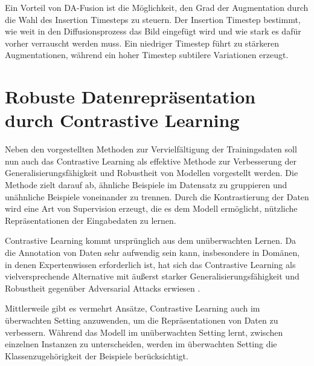 Ein Vorteil von DA-Fusion ist die Möglichkeit, den Grad der Augmentation durch die Wahl des Insertion Timesteps zu steuern. Der Insertion Timestep bestimmt, wie weit in den Diffusionsprozess das Bild eingefügt wird und wie stark es dafür vorher verrauscht werden muss. Ein niedriger Timestep führt zu stärkeren Augmentationen, während ein hoher Timestep subtilere Variationen erzeugt.



\section{Robuste Datenrepräsentation durch Contrastive Learning} \label{sec:contrastive-learning}

Neben den vorgestellten Methoden zur Vervielfältigung der Trainingsdaten soll nun auch das Contrastive Learning als effektive Methode zur Verbesserung der Generalisierungsfähigkeit und Robustheit von Modellen vorgestellt werden. Die Methode zielt darauf ab, ähnliche Beispiele im Datensatz zu gruppieren und unähnliche Beispiele voneinander zu trennen. Durch die Kontrastierung der Daten wird eine Art von Supervision erzeugt, die es dem Modell ermöglicht, nützliche Repräsentationen der Eingabedaten zu lernen.

Contrastive Learning kommt ursprünglich aus dem unüberwachten Lernen. Da die Annotation von Daten sehr aufwendig sein kann, insbesondere in Domänen, in denen Expertenwissen erforderlich ist, hat sich das Contrastive Learning als vielversprechende Alternative mit äußerst starker Generalisierungsfähigkeit und Robustheit gegenüber Adversarial Attacks erwiesen \parencite{Liu2021understandimprovecontrastivelearning}.

Mittlerweile gibt es vermehrt Ansätze, Contrastive Learning auch im überwachten Setting anzuwenden, um die Repräsentationen von Daten zu verbessern. Während das Modell im unüberwachten Setting lernt, zwischen einzelnen Instanzen zu unterscheiden, werden im überwachten Setting die Klassenzugehörigkeit der Beispiele berücksichtigt.

